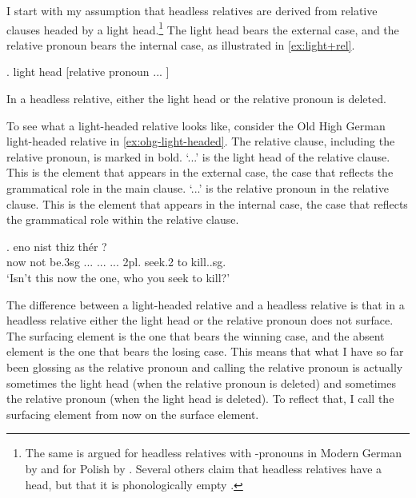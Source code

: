 I start with my assumption that headless relatives are derived from relative clauses headed by a light head.\footnote{
The same is argued for headless relatives with -pronouns in Modern German by \citet{fuss2014,hanink2018} and for Polish by \citet{citko2004}.
Several others claim that headless relatives have a head, but that it is phonologically empty \citep[cf.][]{bresnan1978,groos1981,himmelreich2017,sanfelici2021}.
}
The light head bears the external case, and the relative pronoun bears the internal case, as illustrated in \ref{ex:light+rel}.

\ex. light head [relative pronoun ... ]\label{ex:light+rel}

In a headless relative, either the light head or the relative pronoun is deleted.

To see what a light-headed relative looks like, consider the Old High German light-headed relative in \ref{ex:ohg-light-headed}. The relative clause, including the relative pronoun, is marked in bold.
 `...' is the light head of the relative clause. This is the element that appears in the external case, the case that reflects the grammatical role in the main clause.
 `...' is the relative pronoun in the relative clause. This is the element that appears in the internal case, the case that reflects the grammatical role within the relative clause.

\exg. eno nist thiz thér    
 ?\\
 now {not be.3\ac{sg}}\scsub{[nom]} ... ...
 ... 2\ac{pl}. seek.2\scsub{[acc]} to kill..\ac{sg}.\\
 `Isn't this now the one, who you seek to kill?' \label{ex:ohg-light-headed}

The difference between a light-headed relative and a headless relative is that in a headless relative either the light head or the relative pronoun does not surface.
The surfacing element is the one that bears the winning case, and the absent element is the one that bears the losing case. This means that what I have so far been glossing as the relative pronoun and calling the relative pronoun is actually sometimes the light head (when the relative pronoun is deleted) and sometimes the relative pronoun (when the light head is deleted). To reflect that, I call the surfacing element from now on the surface element.


